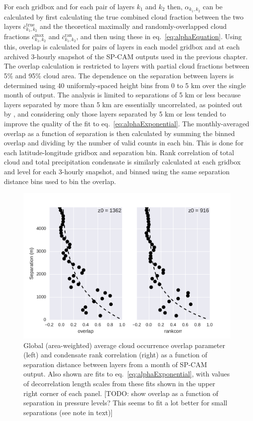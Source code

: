 For each gridbox and for each pair of layers \(k_1\) and \(k_2\) then,
\(\alpha_{k_1, k_2}\) can be calculated by first calculating the true
combined cloud fraction between the two layers
\(\overline{c}^\textrm{true}_{k_1, k_2}\) and the theoretical maximally
and randomly-overlapped cloud fractions
\(\overline{c}^\textrm{max}_{k_1, k_2}\) and
\(\overline{c}^\textrm{ran}_{k_1, k_2}\), and then using these in
eq.~\ref{eq:alphaEquation}. Using this, overlap is calculated for pairs
of layers in each model gridbox and at each archived 3-hourly snapshot
of the SP-CAM outputs used in the previous chapter. The overlap
calculation is restricted to layers with partial cloud fractions between
5\% and 95\% cloud area. The dependence on the separation between layers
is determined using 40 uniformly-spaced height bins from 0 to 5 km over
the single month of output. The analysis is limited to separations of 5
km or less because layers separated by more than 5 km are essentially
uncorrelated, as pointed out by \citet{pincus_et_al_2005}, and
considering only those layers separated by 5 km or less tended to
improve the quality of the fit to eq.~\ref{eq:alphaExponential}. The
monthly-averaged overlap as a function of separation is then calculated
by summing the binned overlap and dividing by the number of valid counts
in each bin. This is done for each latitude-longitude gridbox and
separation bin. Rank correlation of total cloud and total precipitation
condensate is similarly calculated at each gridbox and level for each
3-hourly snapshot, and binned using the same separation distance bins
used to bin the overlap.

\begin{figure}[htbp]
\centering
\includegraphics{graphics/subgrid2_overlap_dz.pdf}
\caption{\label{fig:overlapScatter}Global (area-weighted) average cloud
occurrence overlap parameter (left) and condensate rank correlation
(right) as a function of separation distance between layers from a month
of SP-CAM output. Also shown are fits to eq.~\ref{eq:alphaExponential},
with values of decorrelation length scales from these fits shown in the
upper right corner of each panel. {[}TODO: show overlap as a function of
separation in pressure levels? This seems to fit a lot better for small
separations (see note in text){]}}\label{fig:overlapScatter}
\end{figure}


